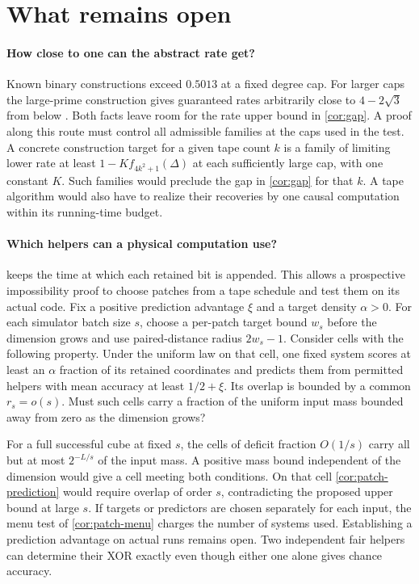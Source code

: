 \section{What remains open}\label{sec:open}

\paragraph{How close to one can the abstract rate get?}
Known binary constructions exceed $0.5013$ at a fixed degree cap.
For larger caps the large-prime construction gives guaranteed rates
arbitrarily close to $4-2\sqrt3$ from below
\cite[Theorem~A$^*$, Lemma~8.1 and Corollary~A$'$]{PaperThirteen}.
Both facts leave room for the rate upper bound in \cref{cor:gap}.
A proof along this route must control all admissible families at the
caps used in the test. A concrete construction target for a given tape
count $k$ is a family of limiting lower rate at least
$1-K f_{4k^2+1}(\Delta)$ at each sufficiently large cap, with one
constant $K$. Such families would preclude the gap in \cref{cor:gap}
for that $k$. A tape algorithm would also have to realize their
recoveries by one causal computation within its running-time budget.

\paragraph{Which helpers can a physical computation use?}
 keeps the time at which each retained bit is
appended. This allows a prospective impossibility proof to choose
patches from a tape schedule and test them on its actual code. Fix a positive prediction advantage $\xi$ and a target
density $\alpha>0$. For each simulator batch size $s$, choose a per-patch
target bound $w_s$ before the dimension grows and use paired-distance
radius $2w_s-1$. Consider cells with the following property. Under the
uniform law on that cell, one fixed system scores at least an $\alpha$
fraction of its retained coordinates and predicts them from permitted
helpers with mean accuracy at least $1/2+\xi$. Its overlap is bounded by
a common $r_s=o(s)$. Must such cells carry a fraction of the uniform input
mass bounded away from zero as the dimension grows?

For a full successful cube at fixed $s$, the cells of deficit fraction
$O(1/s)$ carry all but at most $2^{-L/s}$ of the input mass. A positive
mass bound independent of the dimension would give a cell meeting both
conditions. On that cell \cref{cor:patch-prediction} would require overlap
of order $s$, contradicting the proposed upper bound at large $s$. If
targets or predictors are chosen separately for each input, the menu
test of \cref{cor:patch-menu} charges the number of systems used.
Establishing a prediction advantage on actual runs remains open.
Two independent fair helpers can determine their XOR exactly even though
either one alone gives chance accuracy.
